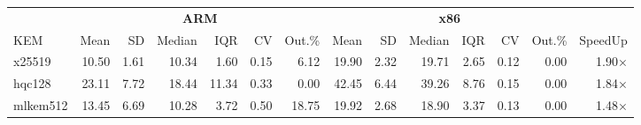 \begin{table}[!ht]
\centering
\begin{tabular}{l|rrrrrr|rrrrrr|r}
\toprule
& \multicolumn{6}{c}{\bfseries ARM} & \multicolumn{6}{c}{\bfseries x86} & \\
\cmidrule(lr){2-7} \cmidrule(lr){8-13}
KEM & Mean & SD & Median & IQR & CV & Out.\% & Mean & SD & Median & IQR & CV & Out.\% & SpeedUp \\
\midrule
x25519 & 10.50 & 1.61 & 10.34 & 1.60 & 0.15 & 6.12 & 19.90 & 2.32 & 19.71 & 2.65 & 0.12 & 0.00 & 1.90× \\
hqc128 & 23.11 & 7.72 & 18.44 & 11.34 & 0.33 & 0.00 & 42.45 & 6.44 & 39.26 & 8.76 & 0.15 & 0.00 & 1.84× \\
mlkem512 & 13.45 & 6.69 & 10.28 & 3.72 & 0.50 & 18.75 & 19.92 & 2.68 & 18.90 & 3.37 & 0.13 & 0.00 & 1.48× \\
\bottomrule
\end{tabular}
\end{table}
